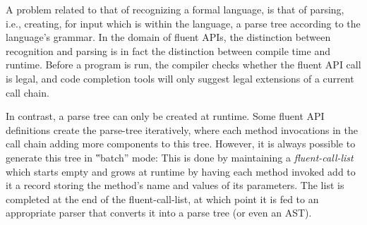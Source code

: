 A problem related to that of recognizing a formal language,
is that of parsing, i.e., creating, for input which is within the language,
  a parse tree according to the language's grammar.
In the domain of fluent APIs, the distinction between recognition and parsing is
  in fact the distinction between compile time and runtime.
Before a program is run, the compiler checks whether the fluent API call is legal,
  and code completion tools will only suggest legal extensions of a current call chain.

In contrast, a parse tree can only be created at runtime.
Some fluent API definitions create the parse-tree
  iteratively, where each method invocations in the call chain adding
  more components to this tree.
However, it is always possible to generate this tree in ‟batch” mode:
This is done by maintaining a \emph{fluent-call-list} which
  starts empty and grows at runtime by having each method invoked add to it
  a record storing the method's name and values of its parameters.
The list is completed at the end of the fluent-call-list, at which point it is fed to an appropriate parser that
  converts it into a parse tree (or even an AST).

